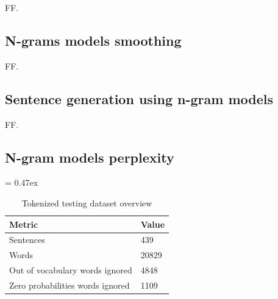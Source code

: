 FF.



\subsection{N-grams models smoothing}

FF.



\subsection{Sentence generation using n-gram models}

FF.



\subsection{N-gram models perplexity}

\begin{table}[t]
	\caption{Tokenized testing dataset overview}
	\extrarowsep = 0.47ex
	\centering
	\begin{tabu} to 0.33\textwidth { X[5,m,l] X[m,r] }
		\rowfont{\bfseries\itshape} Metric & Value \\
		\hline
		Sentences							&	   439	\\
		Words								&	 20829	\\
		Out of vocabulary words ignored		&	  4848	\\
		Zero probabilities words ignored	&	  1109	\\
	\end{tabu}
	\label{tab:n-grams-models-stats}
\end{table}


